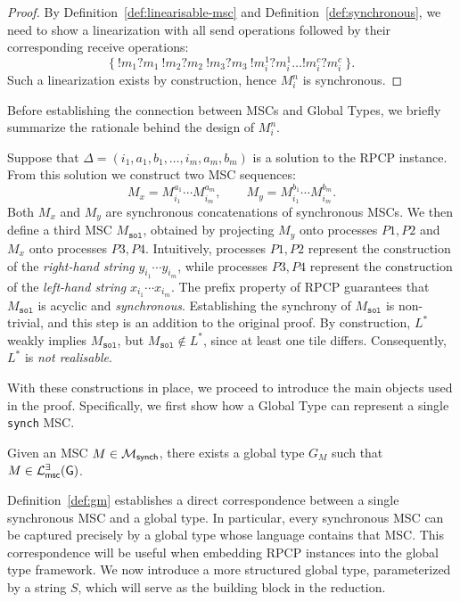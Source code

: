 \begin{proof}
	By Definition~\ref{def:linearisable-msc} and
	Definition~\ref{def:synchronous},
	we need to show a linearization with all send operations
	followed by their corresponding receive operations:
	$$
	\{~!m_1?m_1\ !m_2?m_2\ !m_3?m_3\ !m_i^1?m_i^1 \ldots !m_i^c?m_i^c~\}.
	$$
	Such a linearization exists by construction, hence $M_i^n$ is synchronous.
\end{proof}

Before establishing the connection between MSCs and  
Global Types, we briefly summarize the rationale behind the design of  
$M_i^n$.

Suppose that $\Delta=(i_1,a_1,b_1,\ldots,i_m,a_m,b_m)$ is a  
solution to the RPCP instance. From this solution we construct two MSC  
sequences:
\[
M_x = M^{a_1}_{i_1}\cdots M^{a_m}_{i_m}, \qquad  
M_y = M^{b_1}_{i_1}\cdots M^{b_m}_{i_m}.
\]
Both $M_x$ and $M_y$ are synchronous concatenations of synchronous  
MSCs. We then define a third MSC $M_{\texttt{sol}}$, obtained by  
projecting $M_y$ onto processes $P1,P2$ and $M_x$ onto processes  
$P3,P4$. Intuitively, processes $P1,P2$ represent the construction of  
the \emph{right-hand string} $y_{i_1}\cdots y_{i_m}$, while processes  
$P3,P4$ represent the construction of the \emph{left-hand string}  
$x_{i_1}\cdots x_{i_m}$. The prefix property of RPCP guarantees that  
$M_{\texttt{sol}}$ is acyclic and \emph{synchronous}. Establishing the  
synchrony of $M_{\texttt{sol}}$ is non-trivial, and this step is an  
addition to the original proof. By construction, $L^*$ weakly implies  
$M_{\texttt{sol}}$, but $M_{\texttt{sol}} \notin L^*$, since at least  
one tile differs. Consequently, $L^*$ is \emph{not realisable}.
  
With these constructions in place, we proceed to introduce the main  
objects used in the proof. Specifically, we first show how a Global  
Type can represent a single \verb|synch| MSC.

\bigskip

\begin{definition}[$G_M$]\label{def:gm}
	Given an MSC $M\in \mathcal{M}_{\mathsf{synch}}$, there exists a
	global type $G_M$ such that $M \in \mathcal{L}_{\mathsf{msc}}^{\exists}(\mathsf{G})$.
\end{definition}

Definition~\ref{def:gm} establishes a direct correspondence between a  
single synchronous MSC and a global type. In particular, every  
synchronous MSC can be captured precisely by a global type whose  
language contains that MSC. This correspondence will be useful  
when embedding RPCP instances into the global type framework.
We now introduce a more structured global type, parameterized by a  
string $S$, which will serve as the building block in the reduction.

